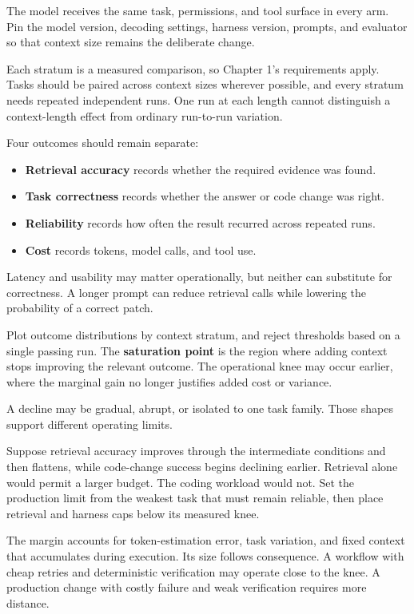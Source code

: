 The model receives the same task, permissions, and tool surface in every arm. Pin the model version, decoding settings, harness version, prompts, and evaluator so that context size remains the deliberate change.

Each stratum is a measured comparison, so Chapter 1's requirements apply. Tasks should be paired across context sizes wherever possible, and every stratum needs repeated independent runs. One run at each length cannot distinguish a context-length effect from ordinary run-to-run variation.


Four outcomes should remain separate:

\begin{itemize}
\tightlist
\item
  \textbf{Retrieval accuracy} records whether the required evidence was found.
\item
  \textbf{Task correctness} records whether the answer or code change was right.
\item
  \textbf{Reliability} records how often the result recurred across repeated runs.
\item
  \textbf{Cost} records tokens, model calls, and tool use.
\end{itemize}

Latency and usability may matter operationally, but neither can substitute for correctness. A longer prompt can reduce retrieval calls while lowering the probability of a correct patch.

Plot outcome distributions by context stratum, and reject thresholds based on a single passing run. The \textbf{saturation point} is the region where adding context stops improving the relevant outcome. The operational knee may occur earlier, where the marginal gain no longer justifies added cost or variance.

A decline may be gradual, abrupt, or isolated to one task family. Those shapes support different operating limits.

Suppose retrieval accuracy improves through the intermediate conditions and then flattens, while code-change success begins declining earlier. Retrieval alone would permit a larger budget. The coding workload would not. Set the production limit from the weakest task that must remain reliable, then place retrieval and harness caps below its measured knee.

The margin accounts for token-estimation error, task variation, and fixed context that accumulates during execution. Its size follows consequence. A workflow with cheap retries and deterministic verification may operate close to the knee. A production change with costly failure and weak verification requires more distance.

